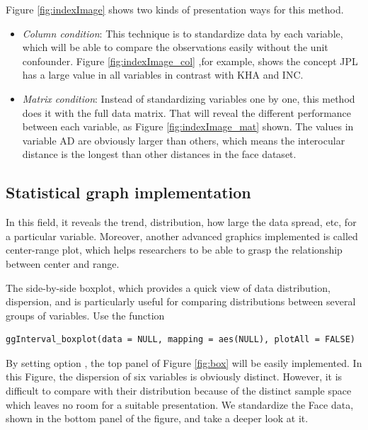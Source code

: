 \documentclass[article]{jss}
\begin{document}
Figure \ref{fig:indexImage} shows two kinds of presentation ways for this method.

\begin{itemize}
  \item \emph{Column condition}: This technique is to standardize data by each variable, which will be able to compare the observations easily without the unit confounder. Figure \ref{fig:indexImage_col} ,for example, shows the concept JPL has a large value in all variables in contrast with KHA and INC.
  \item \emph{Matrix condition}: Instead of standardizing variables one by one, this method does it with the full data matrix. That will reveal the different performance between each variable, as Figure \ref{fig:indexImage_mat} shown. The values in variable AD are obviously larger than others, which means the interocular distance is the longest than other distances in the face dataset.
\end{itemize}


\subsection{Statistical graph implementation}

In this field, it reveals the trend, distribution, how large the data spread, etc, for a particular variable. Moreover, another advanced graphics implemented is called center-range plot, which helps researchers to be able to grasp the relationship between center and range. 

The side-by-side boxplot, which provides a quick view of data distribution, dispersion, and is particularly useful for comparing distributions between several groups of variables. Use the function

\begin{verbatim}
ggInterval_boxplot(data = NULL, mapping = aes(NULL), plotAll = FALSE)
\end{verbatim}

By setting option , the top panel of Figure \ref{fig:box} will be easily implemented. In this Figure, the dispersion of six variables is obviously distinct. However, it is difficult to compare with their distribution because of the distinct sample space which leaves no room for a suitable presentation. We standardize the Face data, shown in the bottom panel of the figure, and take a deeper look at it.
\end{document}
